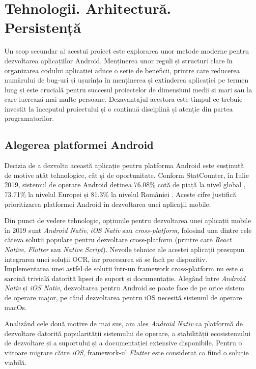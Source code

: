 \chapter{Tehnologii. Arhitectură. Persistență}\label{technical}

Un scop secundar al acestui proiect este explorarea unor metode moderne pentru dezvoltarea aplicațiilor Android. Menținerea unor reguli și structuri clare în organizarea codului aplicației aduce o serie de beneficii, printre care reducerea numărului de bug-uri și ușurința în menținerea și extinderea aplicației pe termen lung și este crucială pentru succesul proiectelor de dimensiuni medii și mari sau la care lucrează mai multe persoane. Dezavantajul acestora este timpul ce trebuie investit la începutul proiectului și o continuă disciplină și atenție din partea programatorilor.

\section{Alegerea platformei Android}

Decizia de a dezvolta această aplicație pentru platforma Android este susținută de motive atât tehnologice, cât și de oportunitate. Conform StatCounter, în Iulie 2019, sistemul de operare Android deținea 76.08\% cotă de piață la nivel global \cite{StatsWorldwide}, 73.71\% la nivelul Europei \cite{StatsEurope} și 81.3\% la nivelul României \cite{StatsRomania}. Aceste cifre justifică prioritizarea platformei Android în dezvoltarea unei aplicații mobile.

Din punct de vedere tehnologic, opțiunile pentru dezvoltarea unei aplicații mobile în 2019 sunt \emph{Android Nativ}, \emph{iOS Nativ} sau \emph{cross-platform}, folosind una dintre cele câteva soluții populare pentru dezvoltare cross-platform (printre care \emph{React Native}, \emph{Flutter} sau \emph{Native Script}). Nevoile tehnice ale acestei aplicații presupun integrarea unei soluții OCR, iar procesarea să se facă pe dispozitiv. Implementarea unei astfel de soluții într-un framework cross-platform nu este o sarcină trivială datorită lipsei de suport și documentație. Alegând între \emph{Android Nativ} și \emph{iOS Nativ}, dezvoltarea pentru Android se poate face de pe orice sistem de operare major, pe când dezvoltarea pentru iOS necesită sistemul de operare macOs. 

Analizând cele două motive de mai sus, am ales \emph{Android Nativ} ca platformă de dezvoltare datorită popularității sistemului de operare, a stabilității ecosistemului de dezvoltare și a suportului și a documentației extensive disponibile. Pentru o viitoare migrare către \emph{iOS}, framework-ul \emph{Flutter} este considerat ca fiind o soluție viabilă.

